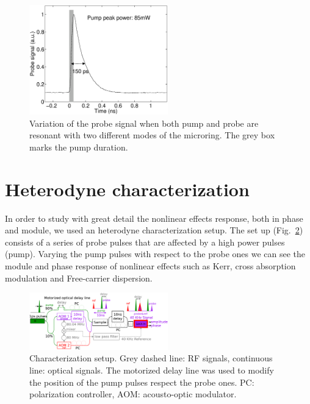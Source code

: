 \documentclass[twocolumn]{el-author}
\begin{document}
\begin{figure}[htb]
    \centering
    \includegraphics[width=60mm]{pos_pulse_big}
    \caption{Variation of the probe signal when both pump and probe are resonant with two different modes of the microring. The grey box marks the pump duration.}
    \label{fig:ntc02switching}
\end{figure}



\section{Heterodyne characterization}
In order to study with great detail the nonlinear effects response, both in phase and module, we used an heterodyne characterization setup. The set up (Fig.~\ref{fig:timeResSetupSwitching}) consists of a series of probe pulses that are affected by a high power pulses (pump). Varying the pump pulses with respect to the probe ones we can see the module and phase response of nonlinear effects such as Kerr, cross absorption modulation and Free-carrier dispersion.


\begin{figure}[htb]
    \centering
    \includegraphics[width=60mm]{timeResolvedBig}
    \caption{Characterization setup. Grey dashed line: RF signals, continuous line: optical signals. The motorized delay line was used to modify the position of the pump pulses respect the probe ones. PC: polarization controller, AOM: acousto-optic modulator.}
    \label{fig:timeResSetupSwitching}
\end{figure}
\end{document}
